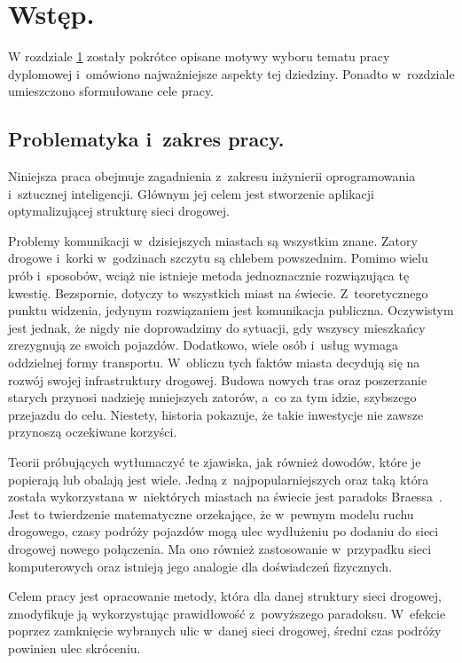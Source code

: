 \documentclass[twoside,12pt]{report}
\let\oldsection\chapter
\def\chapter{\cleardoublepage\oldsection}
\begin{document}


\tableofcontents	%

\chapter{Wstęp.} \label{rozdz.wstep} 

W rozdziale \ref{rozdz.wstep} zostały pokrótce opisane motywy wyboru tematu pracy dyplomowej i~omówiono najważniejsze aspekty tej dziedziny. Ponadto w~rozdziale umieszczono sformułowane cele pracy.

\section{Problematyka i~zakres pracy.}

Niniejsza praca obejmuje zagadnienia z~zakresu inżynierii oprogramowania i~sztucznej inteligencji. Głównym jej celem jest stworzenie aplikacji optymalizującej strukturę sieci drogowej.

Problemy komunikacji w~dzisiejszych miastach są wszystkim znane. Zatory drogowe i~korki w~godzinach szczytu są chlebem powszednim. Pomimo wielu prób i~sposobów, wciąż nie istnieje metoda jednoznacznie rozwiązująca tę kwestię. Bezspornie, dotyczy to wszystkich miast na świecie. Z~teoretycznego punktu widzenia, jedynym rozwiązaniem jest komunikacja publiczna. Oczywistym jest jednak, że nigdy nie doprowadzimy do sytuacji, gdy wszyscy mieszkańcy zrezygnują ze swoich pojazdów. Dodatkowo, wiele osób i~usług wymaga oddzielnej formy transportu. W~obliczu tych faktów miasta decydują się na rozwój swojej infrastruktury drogowej. Budowa nowych tras oraz poszerzanie starych przynosi nadzieję mniejszych zatorów, a~co za tym idzie, szybszego przejazdu do celu. Niestety, historia pokazuje, że takie inwestycje nie zawsze przynoszą oczekiwane korzyści.

Teorii próbujących wytłumaczyć te zjawiska, jak również dowodów, które je popierają lub obalają jest wiele. Jedną z~najpopularniejszych oraz taką która została wykorzystana w~niektórych miastach na świecie jest paradoks Braessa~\cite{braess}. Jest to twierdzenie matematyczne orzekające, że w~pewnym modelu ruchu drogowego, czasy podróży pojazdów mogą ulec wydłużeniu po dodaniu do sieci drogowej nowego połączenia. Ma ono również  zastosowanie w~przypadku  sieci komputerowych oraz istnieją jego analogie dla doświadczeń fizycznych.

Celem pracy jest opracowanie metody, która dla danej struktury sieci drogowej, zmodyfikuje ją wykorzystując prawidłowość z~powyższego paradoksu. W~efekcie poprzez zamknięcie wybranych ulic w~danej sieci drogowej, średni czas podróży powinien ulec skróceniu.
\end{document}
